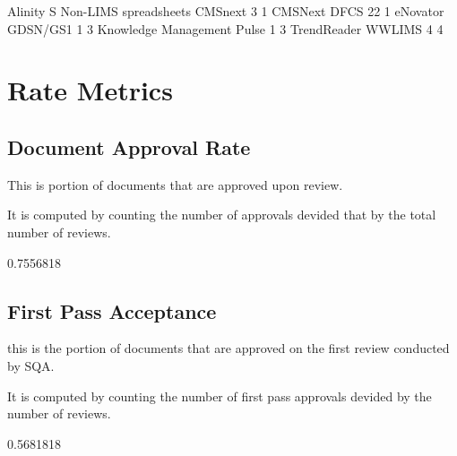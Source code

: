 \documentclass{article}
\begin{document}
\begin{Schunk}
\begin{Soutput}
Alinity S Non-LIMS spreadsheets                         CMSnext
                              3                               1
                        CMSNext                            DFCS
                             22                               1
                       eNovator                        GDSN/GS1
                              1                               3
           Knowledge Management                           Pulse
                              1                               3
                    TrendReader                          WWLIMS
                              4                               4
\end{Soutput}
\end{Schunk}



\section{Rate Metrics}
\subsection{Document Approval Rate}
This is portion of documents that are approved upon review.

It is computed by counting the number of approvals devided that by the total number of reviews.

\begin{Schunk}
\begin{Soutput}
[1] 0.7556818
\end{Soutput}
\end{Schunk}

\subsection{First Pass Acceptance}
this is the portion of documents that are approved on the first review conducted
by SQA.

It is computed by counting the number of first pass approvals devided by
the number of reviews.

\begin{Schunk}
\begin{Soutput}
[1] 0.5681818
\end{Soutput}
\end{Schunk}
\end{document}
